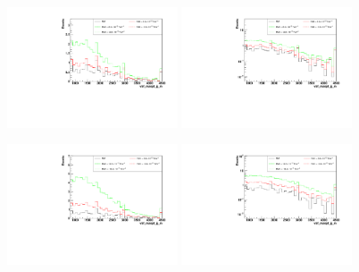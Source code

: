 \begin{figure}[h]
  \begin{center}
	\includegraphics[width=0.45\textwidth]{Plots/aQGC_kinematics/vbf_maxpt_jj_m_FM0.pdf}%
	\includegraphics[width=0.45\textwidth]{Plots/aQGC_kinematics/vbf_maxpt_jj_m_FM0_log.pdf}\\
    \caption{}
  \end{center}
\end{figure}
\begin{figure}[h]
  \begin{center}
	\includegraphics[width=0.45\textwidth]{Plots/aQGC_kinematics/vbf_maxpt_jj_m_FM1.pdf}%
	\includegraphics[width=0.45\textwidth]{Plots/aQGC_kinematics/vbf_maxpt_jj_m_FM1_log.pdf}\\
    \caption{}
  \end{center}
\end{figure}
